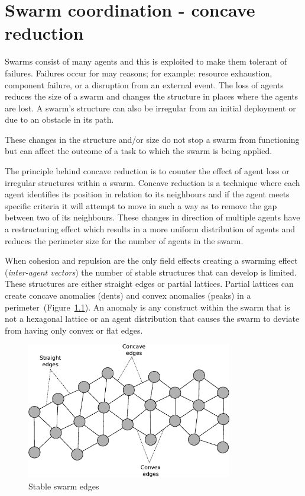 \chapter{Swarm coordination - concave reduction}\label{chapter:ConcaveReduction}
Swarms consist of many agents and this is exploited to make them tolerant of failures. Failures occur for may reasons; for example: resource exhaustion, component failure, or a disruption from an external event. The loss of agents reduces the size of a swarm and changes the structure in places where the agents are lost. A swarm's structure can also be irregular from an initial deployment or due to an obstacle in its path.

These changes in the structure and/or size do not stop a swarm from functioning but can affect the outcome of a task to which the swarm is being applied. 

The principle behind concave reduction is to counter the effect of agent loss or irregular structures within a swarm. Concave reduction is a technique where each agent identifies its position in relation to its neighbours and if the agent meets specific criteria it will attempt to move in such a way as to remove the gap between two of its neighbours. These changes in direction of multiple agents have a restructuring effect which results in a more uniform distribution of agents and reduces the perimeter size for the number of agents in the swarm.
 
When cohesion and repulsion are the only field effects creating a swarming effect (\textit{inter-agent vectors}) the number of stable structures that can develop is limited. These structures are either straight edges or partial lattices. Partial lattices can create concave anomalies (dents) and convex anomalies (peaks) in a perimeter~(Figure~\ref{concave:SwarmStableShape1}). An anomaly is any construct within the swarm that is not a hexagonal lattice or an agent distribution that causes the swarm to deviate from having only convex or flat edges. 

\begin{figure}[H]
\begin{center}
\includegraphics[width=9cm]{CHAPTER-7/figures/SwarmStableShape1}
\end{center}
\caption{Stable swarm edges\label{concave:SwarmStableShape1}}
\end{figure}

